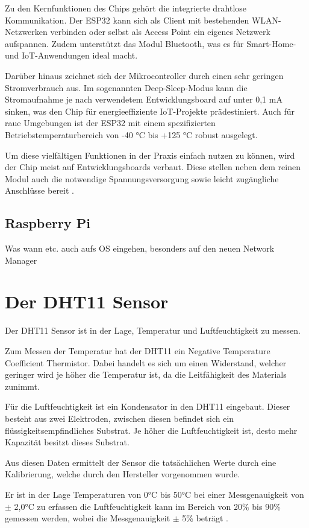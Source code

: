 Zu den Kernfunktionen des Chips gehört die integrierte drahtlose Kommunikation. Der ESP32 kann sich als Client mit bestehenden WLAN-Netzwerken verbinden oder selbst als Access Point ein eigenes Netzwerk aufspannen. Zudem unterstützt das Modul Bluetooth, was es für Smart-Home- und \ac{IoT}-Anwendungen ideal macht.

Darüber hinaus zeichnet sich der Mikrocontroller durch einen sehr geringen Stromverbrauch aus. Im sogenannten Deep-Sleep-Modus kann die Stromaufnahme je nach verwendetem Entwicklungsboard auf unter 0,1 mA sinken, was den Chip für energieeffiziente \ac{IoT}-Projekte prädestiniert. Auch für raue Umgebungen ist der ESP32 mit einem spezifizierten Betriebstemperaturbereich von -40 °C bis +125 °C robust ausgelegt.

Um diese vielfältigen Funktionen in der Praxis einfach nutzen zu können, wird der Chip meist auf Entwicklungsboards verbaut. Diese stellen neben dem reinen Modul auch die notwendige Spannungsversorgung sowie leicht zugängliche Anschlüsse bereit .

\subsection{Raspberry Pi}
Was wann etc. auch aufs OS eingehen, besonders auf den neuen Network Manager

\section{Der DHT11 Sensor}
Der DHT11 Sensor ist in der Lage, Temperatur und Luftfeuchtigkeit zu messen.

Zum Messen der Temperatur hat der DHT11 ein Negative Temperature Coefficient
Thermistor. Dabei handelt es sich um einen Widerstand, welcher geringer wird je höher die Temperatur ist, da die Leitfähigkeit des Materials zunimmt.

Für die Luftfeuchtigkeit ist ein Kondensator in den DHT11 eingebaut. Dieser besteht aus zwei Elektroden, zwischen diesen  befindet sich ein flüssigkeitsempfindliches Substrat. Je höher die Luftfeuchtigkeit ist, desto mehr Kapazität besitzt dieses Substrat.

Aus diesen Daten ermittelt der Sensor die tatsächlichen Werte durch eine Kalibrierung, welche durch den Hersteller vorgenommen wurde.

Er ist in der Lage Temperaturen von 0°C bis 50°C bei einer Messgenauigkeit von  $\pm$ 2,0°C
zu erfassen die Luftfeuchtigkeit kann im Bereich von 20\% bis 90\% gemessen werden, wobei die Messgenauigkeit $\pm$ 5\% beträgt .

